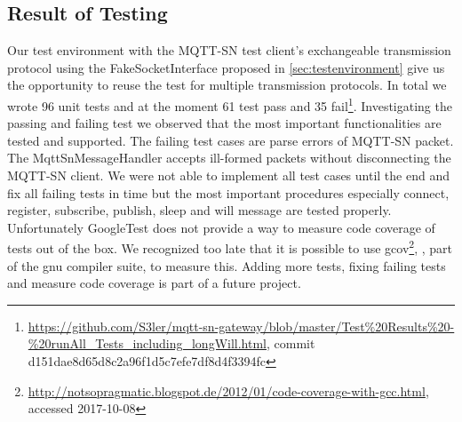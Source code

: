 \subsection{Result of Testing}
Our test environment with the MQTT-SN test client's exchangeable transmission protocol using the FakeSocketInterface proposed in \autoref{sec:testenvironment} give us the opportunity to reuse the test for multiple transmission protocols.
In total we wrote 96 unit tests and at the moment 61 test pass and 35 fail\footnote{\url{https://github.com/S3ler/mqtt-sn-gateway/blob/master/Test\%20Results\%20-\%20runAll_Tests_including_longWill.html}, commit d151dae8d65d8c2a96f1d5c7efe7df8d4f3394fc}.
Investigating the passing and failing test we observed that the most important functionalities are tested and supported.
The failing test cases are parse errors of MQTT-SN packet.
The MqttSnMessageHandler accepts ill-formed packets without disconnecting the MQTT-SN client.
We were not able to implement all test cases until the end and fix all failing tests in time but the most important procedures especially connect, register, subscribe, publish, sleep and will message are tested properly.
Unfortunately GoogleTest does not provide a way to measure code coverage of tests out of the box.
We recognized too late that it is possible to use gcov\footnote{\url{http://notsopragmatic.blogspot.de/2012/01/code-coverage-with-gcc.html}, accessed 2017-10-08}, , part of the gnu compiler suite, to measure this.
Adding more tests, fixing failing tests and measure code coverage is part of a future project.